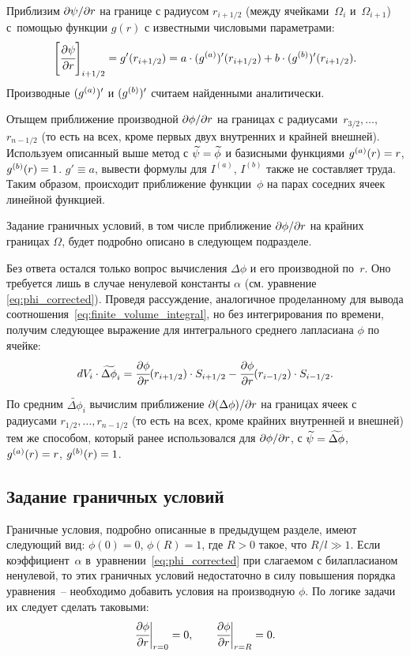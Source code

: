 Приблизим $\partial \psi / \partial r$ на границе с радиусом $r_{i + 1/2}$ (между ячейками~$\Omega_i$ и~$\Omega_{i + 1}$) с~помощью функции $g(r)$ с известными числовыми параметрами:
\[
    \left[ \cfrac{\partial \psi}{\partial r} \right]_{i + 1/2} = g'(r_{i + 1/2}) = a \cdot ({g^{(a)}})'(r_{i + 1/2}) + b \cdot ({g^{(b)}})'(r_{i + 1/2}).
\]
Производные $({g^{(a)}})'$ и $({g^{(b)}})'$ считаем найденными аналитически.

Отыщем приближение производной $\partial \phi / \partial r$ на границах с радиусами~$r_{3/2}, \dots,$ $r_{n - 1/2}$ (то есть на всех, кроме первых двух внутренних и крайней внешней). Используем описанный выше метод с ${\widetilde{\psi}} = {\widetilde{\phi}}$ и базисными функциями ${g^{(a)}}(r) = r$, ${g^{(b)}}(r) = 1$. $g' \equiv a$, вывести формулы для $I^{(a)}$, $I^{(b)}$ также не составляет труда. Таким образом, происходит приближение функции~$\phi$ на парах соседних ячеек линейной функцией.

Задание граничных условий, в том числе приближение $\partial \phi / \partial r$ на крайних границах $\Omega$, будет подробно описано в следующем подразделе.

Без ответа остался только вопрос вычисления $\Delta \phi$ и его производной по~$r$. Оно требуется лишь в случае ненулевой константы $\alpha$ (см. уравнение \eqref{eq:phi_corrected}). Проведя рассуждение, аналогичное проделанному для вывода соотношения~\eqref{eq:finite_volume_integral}, но без интегрирования по времени, получим следующее выражение для интегрального среднего лапласиана $\phi$ по ячейке:
\[
    dV_i \cdot \widetilde{\Delta \phi}_i = \cfrac{\partial \phi}{\partial r} (r_{i + 1/2}) \cdot S_{i + 1/2} - \cfrac{\partial \phi}{\partial r} (r_{i - 1/2}) \cdot S_{i - 1/2}.
\]

По средним $\widetilde{\Delta \phi}_i$ вычислим приближение $\partial (\Delta \phi) / \partial r$ на границах ячеек с радиусами $r_{1/2}, \dots, r_{n - 1/2}$ (то есть на всех, кроме крайних внутренней и внешней) тем же способом, который ранее использовался для $\partial \phi / \partial r$, с ${\widetilde{\psi}} = \widetilde{\Delta \phi}$, ${g^{(a)}}(r) = r$, ${g^{(b)}}(r) = 1$.


\subsection{Задание граничных условий}

Граничные условия, подробно описанные в предыдущем разделе, имеют следующий вид: $\phi(0) = 0$, $\phi(R) = 1$, где $R > 0$ такое, что $R / l \gg 1$. Если коэффициент~$\alpha$ в~уравнении~\eqref{eq:phi_corrected} при слагаемом с билапласианом ненулевой, то этих граничных условий недостаточно в силу повышения порядка уравнения~-- необходимо добавить условия на производную $\phi$. По логике задачи их следует сделать таковыми:
\[
    \cfrac{\partial \phi}{\partial r} \bigg|_{r = 0} = 0, \qquad \cfrac{\partial \phi}{\partial r} \bigg|_{r = R} = 0.
\]

